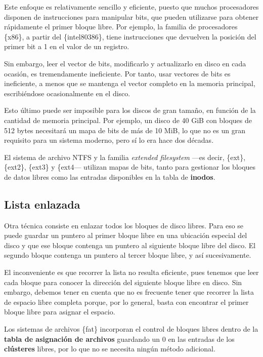 Este enfoque es relativamente sencillo y eficiente, puesto que muchos
procesadores disponen de instrucciones para manipular bits, que pueden
utilizarse para obtener rápidamente el primer bloque libre. Por ejemplo,
la familia de procesadores \{x86\}, a partir del \{intel80386\}, tiene
instrucciones que devuelven la posición del primer bit a 1 en el valor
de un registro.

Sin embargo, leer el vector de bits, modificarlo y actualizarlo en disco
en cada ocasión, es tremendamente ineficiente. Por tanto, usar vectores
de bits es ineficiente, a menos que se mantenga el vector completo en la
memoria principal, escribiéndose ocasionalmente en el disco.

Esto último puede ser imposible para los discos de gran tamaño, en
función de la cantidad de memoria principal. Por ejemplo, un disco de 40
GiB con bloques de 512 bytes necesitará un mapa de bits de más de 10
MiB, lo que no es un gran requisito para un sistema moderno, pero sí lo
era hace dos décadas.

El sistema de archivo NTFS y la familia \emph{extended filesystem} ---es
decir, \{ext\}, \{ext2\}, \{ext3\} y \{ext4--- utilizan mapas de bits,
tanto para gestionar los bloques de datos libres como las entradas
disponibles en la tabla de \textbf{inodos}.

\subsection{Lista enlazada}\label{_lista_enlazada}

Otra técnica consiste en enlazar todos los bloques de disco libres. Para
eso se puede guardar un puntero al primer bloque libre en una ubicación
especial del disco y que ese bloque contenga un puntero al siguiente
bloque libre del disco. El segundo bloque contenga un puntero al tercer
bloque libre, y así sucesivamente.

El inconveniente es que recorrer la lista no resulta eficiente, pues
tenemos que leer cada bloque para conocer la dirección del siguiente
bloque libre en disco. Sin embargo, debemos tener en cuenta que no es
frecuente tener que recorrer la lista de espacio libre completa porque,
por lo general, basta con encontrar el primer bloque libre para asignar
el espacio.

Los sistemas de archivos \{fat\} incorporan el control de bloques libres
dentro de la \textbf{tabla de asignación de archivos} guardando un 0 en
las entradas de los \textbf{clústeres} libres, por lo que no se necesita
ningún método adicional.

